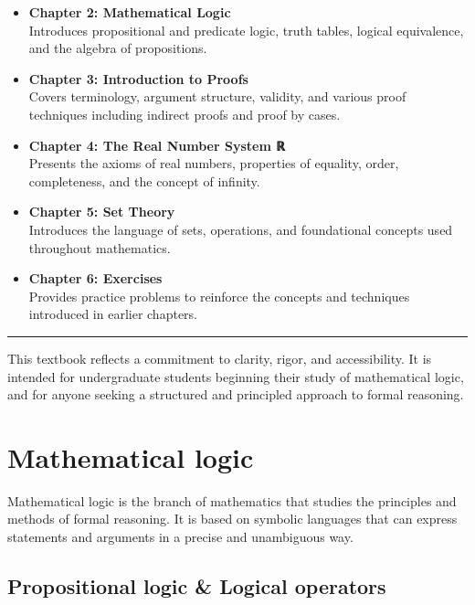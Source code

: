 \documentclass[
]{book}
\theoremstyle{definition}
\theoremstyle{definition}
\theoremstyle{definition}
\theoremstyle{definition}
\theoremstyle{remark}
\begin{document}
\begin{itemize}
\item
  \textbf{Chapter 2: Mathematical Logic}\\
  Introduces propositional and predicate logic, truth tables, logical equivalence, and the algebra of propositions.
\item
  \textbf{Chapter 3: Introduction to Proofs}\\
  Covers terminology, argument structure, validity, and various proof techniques including indirect proofs and proof by cases.
\item
  \textbf{Chapter 4: The Real Number System ℝ}\\
  Presents the axioms of real numbers, properties of equality, order, completeness, and the concept of infinity.
\item
  \textbf{Chapter 5: Set Theory}\\
  Introduces the language of sets, operations, and foundational concepts used throughout mathematics.
\item
  \textbf{Chapter 6: Exercises}\\
  Provides practice problems to reinforce the concepts and techniques introduced in earlier chapters.
\end{itemize}

\begin{center}\rule{0.5\linewidth}{0.5pt}\end{center}

This textbook reflects a commitment to clarity, rigor, and accessibility. It is intended for undergraduate students beginning their study of mathematical logic, and for anyone seeking a structured and principled approach to formal reasoning.

\chapter{Mathematical logic}\label{mathematical-logic}

Mathematical logic is the branch of mathematics that studies the principles and methods of formal reasoning. It is based on symbolic languages that can express statements and arguments in a precise and unambiguous way.

\section{Propositional logic \& Logical operators}\label{propositional-logic-logical-operators}
\end{document}
